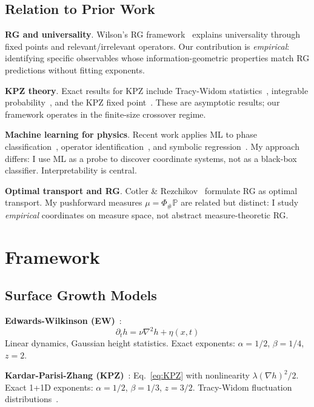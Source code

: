 \documentclass[aps,pre,reprint,amsmath,amssymb,superscriptaddress]{revtex4-2}
\newcommand{\bbP}{\mathbb{P}}
\begin{document}
\subsection{Relation to Prior Work}

\textbf{RG and universality}. Wilson's RG framework~\cite{Wilson1975} explains universality through fixed points and relevant/irrelevant operators. Our contribution is \textit{empirical}: identifying specific observables whose information-geometric properties match RG predictions without fitting exponents.

\textbf{KPZ theory}. Exact results for KPZ include Tracy-Widom statistics~\cite{TracyWidom1994}, integrable probability~\cite{Corwin2012}, and the KPZ fixed point~\cite{Matetski2021}. These are asymptotic results; our framework operates in the finite-size crossover regime.

\textbf{Machine learning for physics}. Recent work applies ML to phase classification~\cite{Carrasquilla2017}, operator identification~\cite{Zhang2019}, and symbolic regression~\cite{Udrescu2020}. My approach differs: I use ML as a probe to discover coordinate systems, not as a black-box classifier. Interpretability is central.

\textbf{Optimal transport and RG}. Cotler \& Rezchikov~\cite{Cotler2022} formulate RG as optimal transport. My pushforward measures $\mu = \Phi_\# \bbP$ are related but distinct: I study \textit{empirical} coordinates on measure space, not abstract measure-theoretic RG.

\section{Framework}
\label{sec:framework}

\subsection{Surface Growth Models}

\textbf{Edwards-Wilkinson (EW)}~\cite{Edwards1982}:
\begin{equation}
\partial_t h = \nu \nabla^2 h + \eta(x,t)
\label{eq:EW}
\end{equation}
Linear dynamics, Gaussian height statistics. Exact exponents: $\alpha = 1/2$, $\beta = 1/4$, $z=2$.

\textbf{Kardar-Parisi-Zhang (KPZ)}~\cite{KPZ1986}: Eq.~\eqref{eq:KPZ} with nonlinearity $\lambda(\nabla h)^2/2$. Exact 1+1D exponents: $\alpha = 1/2$, $\beta = 1/3$, $z=3/2$. Tracy-Widom fluctuation distributions~\cite{TracyWidom1994}.
\end{document}
